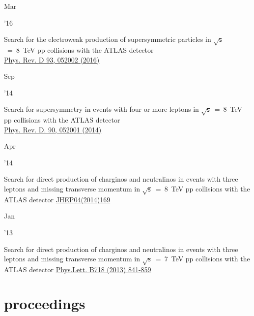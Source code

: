 \documentclass[]{cv} %
\begin{document}
\begin{entrylist}
  \entry
  {\parbox[t]{\parboxWidthOne}{Mar}\parbox[t]{\parboxWidthTwo}{\hfill '16}}
  {Search for the electroweak production of supersymmetric particles in
    $\sqrt{\mathsf{s}}$~=~8~TeV pp collisions with the ATLAS detector\\}
    {\href{https://journals.aps.org/prd/abstract/10.1103/PhysRevD.93.052002}{Phys. Rev. D 93, 052002 (2016)}}
  {\vspace*{\spacingPubs}}

  \entry
  {\parbox[t]{\parboxWidthOne}{Sep}\parbox[t]{\parboxWidthTwo}{\hfill '14}}
  {Search for supersymmetry in events with four or more leptons in $\sqrt{\mathsf{s}}$~=~8~TeV pp collisions with the ATLAS detector\\}
  {\href{https://journals.aps.org/prd/abstract/10.1103/PhysRevD.90.052001}{Phys. Rev. D. 90, 052001 (2014)}}
  {\vspace*{\spacingPubs}}

  \entry
  {\parbox[t]{\parboxWidthOne}{Apr}\parbox[t]{\parboxWidthTwo}{\hfill '14}}
  {Search for direct production of charginos and neutralinos in events with three leptons and missing transverse momentum in $\sqrt{\mathsf{s}}$~=~8~TeV pp collisions with the ATLAS detector}
{\href{https://link.springer.com/article/10.1007\%2FJHEP04\%282014\%29169}{JHEP04(2014)169}}
{\vspace*{\spacingPubs}}

    \entry
    {\parbox[t]{\parboxWidthOne}{Jan}\parbox[t]{\parboxWidthTwo}{\hfill '13}}
    {Search for direct production of charginos and neutralinos in events with three leptons and missing transverse momentum in $\sqrt{\mathsf{s}}$~=~7~TeV pp collisions with the ATLAS detector}
  {\href{https://www.sciencedirect.com/science/article/pii/S037026931201204X}{Phys.Lett. B718 (2013) 841-859}}
  {\vspace*{\spacingPubs}}

\end{entrylist}

\section{proceedings}
\end{document}
